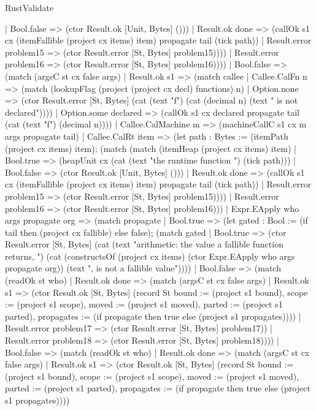 \begin{lexlean}{RustValidate}
\begin{semanticmodule}
{                | Bool.false => (ctor Result.ok [Unit, Bytes] ()))
              | Result.ok done => (callOk s1 cx (itemFallible (project cx items) item) propagate tail (tick path))
              | Result.error problem15 => (ctor Result.error [St, Bytes] problem15))))
          | Result.error problem16 => (ctor Result.error [St, Bytes] problem16))))
      | Bool.false => (match (argsC st cx false args)
        | Result.ok s1 => (match callee
          | Callee.CalFn n => (match (lookupFlag (project (project cx decl) functions) n)
            | Option.none => (ctor Result.error [St, Bytes] (cat (text "f") (cat (decimal n) (text " is not declared"))))
            | Option.some declared => (callOk s1 cx declared propagate tail (cat (text "f") (decimal n))))
          | Callee.CalMachine m => (machineCallC s1 cx m args propagate tail)
          | Callee.CalRt item => (let path : Bytes := (itemPath (project cx items) item); (match (match (itemHeap (project cx items) item)
              | Bool.true => (heapUnit cx (cat (text "the runtime function ") (tick path)))
              | Bool.false => (ctor Result.ok [Unit, Bytes] ()))
            | Result.ok done => (callOk s1 cx (itemFallible (project cx items) item) propagate tail (tick path))
            | Result.error problem15 => (ctor Result.error [St, Bytes] problem15))))
        | Result.error problem16 => (ctor Result.error [St, Bytes] problem16)))
    | Expr.EApply who args propagate org => (match propagate
      | Bool.true => (let gated : Bool := (if tail then (project cx fallible) else false); (match gated
        | Bool.true => (ctor Result.error [St, Bytes] (cat (text "arithmetic: the value a fallible function returns, ") (cat (constructsOf (project cx items) (ctor Expr.EApply who args propagate org)) (text ", is not a fallible value"))))
        | Bool.false => (match (readOk st who)
          | Result.ok done => (match (argsC st cx false args)
            | Result.ok s1 => (ctor Result.ok [St, Bytes] (record St {bound := (project s1 bound), scope := (project s1 scope), moved := (project s1 moved), parted := (project s1 parted), propagates := (if propagate then true else (project s1 propagates))}))
            | Result.error problem17 => (ctor Result.error [St, Bytes] problem17))
          | Result.error problem18 => (ctor Result.error [St, Bytes] problem18))))
      | Bool.false => (match (readOk st who)
        | Result.ok done => (match (argsC st cx false args)
          | Result.ok s1 => (ctor Result.ok [St, Bytes] (record St {bound := (project s1 bound), scope := (project s1 scope), moved := (project s1 moved), parted := (project s1 parted), propagates := (if propagate then true else (project s1 propagates))}))
}
\end{semanticmodule}
\end{lexlean}
